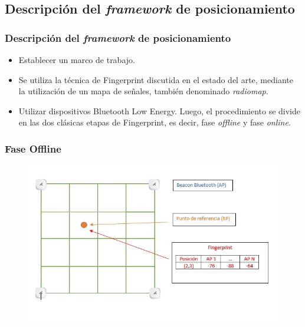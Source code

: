 \documentclass[handout]{beamer}
\begin{document}
\subsection{Descripción del \textit{framework} de posicionamiento}
\begin{frame}
\frametitle{Descripción del \textit{framework} de posicionamiento}

\begin{itemize}

\item Establecer un marco de trabajo.

\pause

\item Se utiliza la técnica de Fingerprint discutida en el estado del arte, mediante la utilización de un mapa de señales, también denominado \textit{radiomap}.

\pause

\item Utilizar dispositivos Bluetooth Low Energy. Luego, el procedimiento se divide en las dos clásicas etapas de Fingerprint, es decir, fase \textit{offline} y fase \textit{online}.
\end{itemize}


\end{frame}


\begin{frame}
\frametitle{Fase Offline}

\begin{figure}
\includegraphics[width=\textwidth]{../figures/fingerprints.jpg}
\end{figure}

\end{frame}
\end{document}
